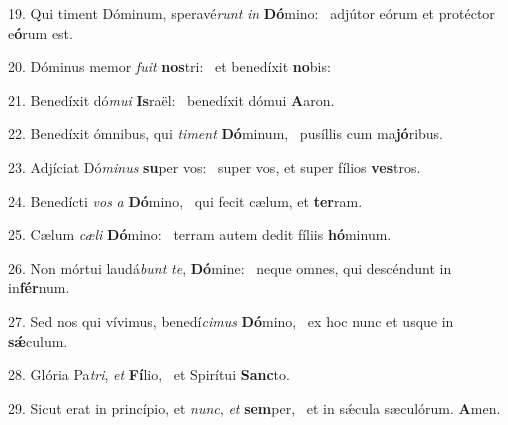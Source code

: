 19. Qui timent Dóminum, speravé\textit{runt} \textit{in} \textbf{Dó}mino: \ast\  adjútor eórum et protéctor e\textbf{ó}rum est.\

20. Dóminus memor \textit{fu}\textit{it} \textbf{nos}tri: \ast\  et benedíxit \textbf{no}bis:\

21. Benedíxit dó\textit{mu}\textit{i} \textbf{Is}raël: \ast\  benedíxit dómui \textbf{A}aron.\

22. Benedíxit ómnibus, qui \textit{ti}\textit{ment} \textbf{Dó}minum, \ast\  pusíllis cum ma\textbf{jó}ribus.\

23. Adjíciat Dó\textit{mi}\textit{nus} \textbf{su}per vos: \ast\  super vos, et super fílios \textbf{ves}tros.\

24. Benedícti \textit{vos} \textit{a} \textbf{Dó}mino, \ast\  qui fecit cælum, et \textbf{ter}ram.\

25. Cælum \textit{cæ}\textit{li} \textbf{Dó}mino: \ast\  terram autem dedit fíliis \textbf{hó}minum.\

26. Non mórtui laudá\textit{bunt} \textit{te}, \textbf{Dó}mine: \ast\  neque omnes, qui descéndunt in in\textbf{fér}num.\

27. Sed nos qui vívimus, benedí\textit{ci}\textit{mus} \textbf{Dó}mino, \ast\  ex hoc nunc et usque in \textbf{sǽ}culum.\

28. Glória Pa\textit{tri}, \textit{et} \textbf{Fí}lio, \ast\  et Spirítui \textbf{Sanc}to.\

29. Sicut erat in princípio, et \textit{nunc}, \textit{et} \textbf{sem}per, \ast\  et in sǽcula sæculórum. \textbf{A}men.\

